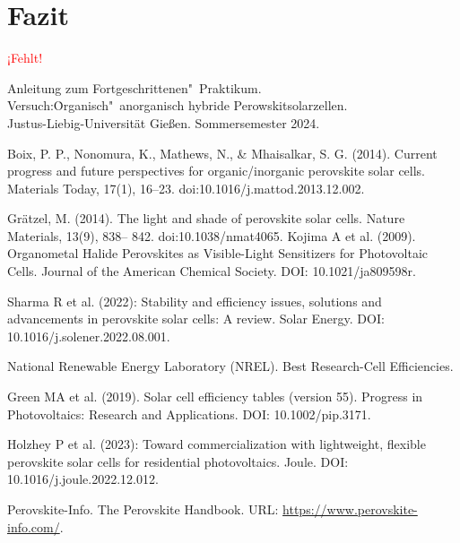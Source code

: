 \documentclass[12pt,a4paper,ngerman]{report}
\providecommand{\fehlt}{\textcolor{red}{{ ¡Fehlt! }}}
\begin{document}
\chapter{Fazit}
	\fehlt

\listoffigures%
	
\begin{thebibliography}{111}%
	Anleitung zum Fortgeschrittenen"~Praktikum.\\ \glqq Versuch:\.Organisch"~anorganisch hybride Perowskitsolarzellen\grqq.\\ Justus-Liebig-Universität Gießen. Sommersemester 2024.
	
	Boix, P. P., Nonomura, K., Mathews, N., \& Mhaisalkar, S. G. (2014). Current progress and future perspectives for organic/inorganic perovskite solar cells. Materials Today, 17(1), 16–23. doi:10.1016/j.mattod.2013.12.002.

	Grätzel, M. (2014). The light and shade of perovskite solar cells. Nature Materials, 13(9), 838– 842. doi:10.1038/nmat4065.
	Kojima A et al. (2009). Organometal Halide Perovskites as Visible-Light Sensitizers for Photovoltaic Cells.
	Journal of the American Chemical Society. DOI: 10.1021/ja809598r.
	
	Sharma R et al. (2022): Stability and efficiency issues, solutions and advancements in perovskite solar cells: A review. Solar Energy. DOI: 10.1016/j.solener.2022.08.001.

	National Renewable Energy Laboratory (NREL). Best Research-Cell Efficiencies.

	Green MA et al. (2019). Solar cell efficiency tables (version 55). Progress in Photovoltaics: Research and Applications. DOI: 10.1002/pip.3171.

	Holzhey P et al. (2023): Toward commercialization with lightweight, flexible perovskite solar cells for residential photovoltaics. Joule. DOI: 10.1016/j.joule.2022.12.012.

	Perovskite-Info. The Perovskite Handbook. URL: \url{https://www.perovskite-info.com/}.
	
	\end{thebibliography}


\end{document}

